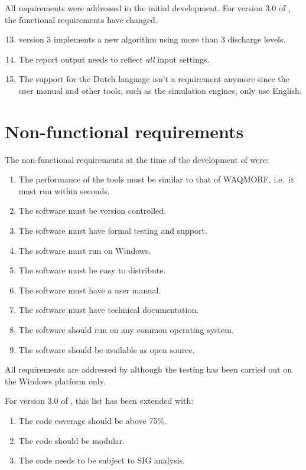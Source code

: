All requirements were addressed in the initial development.
For version 3.0 of \dfastmi, the functional requirements have changed.

\begin{enumerate}
\setcounter{enumi}{12} %
\item \dfastmi version 3 implements a new algorithm using more than 3 discharge levels.
\item The report output needs to reflect \emph{all} input settings.
\item The support for the Dutch language isn't a requirement anymore since the user manual and other tools, such as the simulation engines, only use English.
\end{enumerate}


\section{Non-functional requirements}

The non-functional requirements at the time of the development of  were:

\begin{enumerate}
\item The performance of the tools must be similar to that of WAQMORF, i.e.~it must run within seconds.
\item The software must be version controlled.
\item The software must have formal testing and support.
\item The software must run on Windows.
\item The software must be easy to distribute.
\item The software must have a user manual.
\item The software must have technical documentation.

\item The software should run on any common operating system.
\item The software should be available as open source.
\end{enumerate}

All requirements are addressed by \dfastmi although the testing has been carried out on the Windows platform only.

For version 3.0 of \dfastmi, this list has been extended with:

\begin{enumerate}
\item The code coverage should be above 75\%.
\item The code should be modular.
\item The code needs to be subject to SIG analysis.
\end{enumerate}

